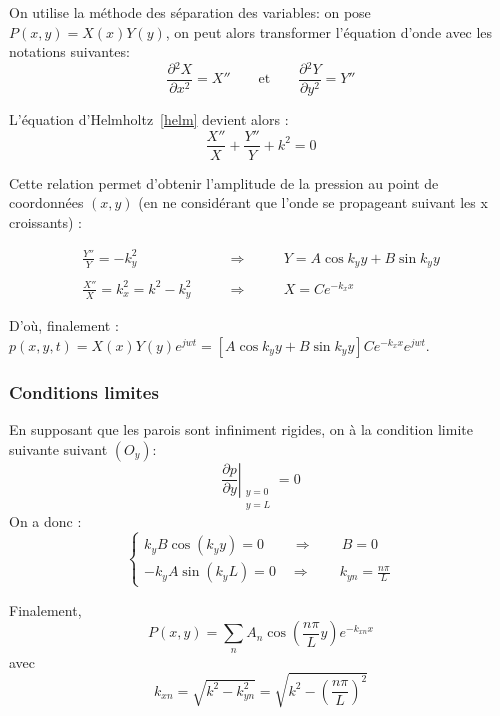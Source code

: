 \documentclass[a4paper,11pt]{report} %
\begin{document}
On utilise la méthode des séparation des variables: on pose $P(x,y) = X(x)Y(y)$, on peut alors transformer l'équation d'onde avec les notations suivantes:
\begin{equation*}
\frac{\partial{^2X}}{\partial{x^2}} = X'' \qquad \text{et} \qquad \frac{\partial{^2Y}}{\partial{y^2}} = Y'' 
\end{equation*}

L'équation d'Helmholtz~\ref{helm} devient alors :
\begin{equation*}
\frac{X''}{X} +\frac{Y''}{Y} + k^2 = 0
\end{equation*}

Cette relation permet d'obtenir l'amplitude de la pression au point de coordonnées $(x,y)$ (en ne considérant que l'onde se propageant suivant les x croissants) : 

\begin{eqnarray*}
	 \frac{Y''}{Y} = -k_y^2 \qquad & \Rightarrow & \qquad Y = A\cos{k_yy}+B\sin{k_yy} \\~ \\
	 \frac{X''}{X} = k_x^2 = k^{2} - k_y^2 \qquad & \Rightarrow & \qquad X = Ce^{-k_xx}
\end{eqnarray*}

D'où, finalement : $p(x,y,t) = X(x)Y(y)e^{jwt} =   [A\cos{k_yy}+B\sin{k_yy}]Ce^{-k_xx} e^{jwt}$.

\subsubsection{Conditions limites}
En supposant que les parois sont infiniment rigides, on à la condition limite suivante suivant $(O_y)$: 
\begin{equation*}
\left.\frac{\partial{p}}{\partial{y}}\right|_{\begin{smallmatrix}y=0 \\ y=L\end{smallmatrix}} = 0
\end{equation*}
On a donc : \begin{equation*}
				\begin{cases}
					k_yB\cos(k_yy) = 0 \qquad \Rightarrow \qquad B = 0 \\
					-k_yA\sin(k_yL) = 0 \quad \Rightarrow \qquad k_{yn} = \frac{n\pi}{L}
				\end{cases}
		\end{equation*}


Finalement,	\begin{equation*}
				P(x,y) = \sum_n A_n \cos\left(\frac{n\pi}{L}y\right)e^{-k_{xn}x}
			\end{equation*}
avec \begin{equation*}
			k_{xn} =\sqrt{k^2-k_{yn}^2}= \sqrt{k^2-\left(\frac{n\pi}{L}\right)^2}
		\end{equation*}
\end{document}
